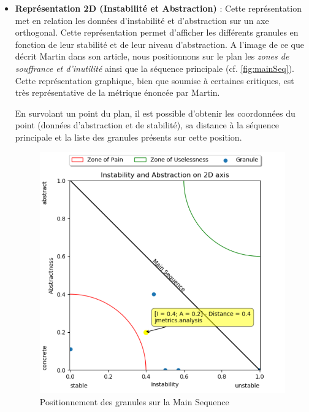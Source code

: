 \documentclass{scrartcl}
\begin{document}
\begin{itemize}
        \vspace{25mm}
        \item \textbf{Représentation 2D (Instabilité et Abstraction)} : Cette représentation met en relation les données d'instabilité et d'abstraction sur un axe orthogonal. Cette représentation permet d'afficher les différents granules en fonction de leur stabilité et de leur niveau d'abstraction. A l'image de ce que décrit Martin dans son article, nous positionnons sur le plan les \emph{zones de souffrance et d'inutilité} ainsi que la séquence principale (cf. \ref{fig:mainSeq}). Cette représentation graphique, bien que soumise à certaines critiques, est très représentative de la métrique énoncée par Martin.
        
        En survolant un point du plan, il est possible d'obtenir les coordonnées du point (données d'abstraction et de stabilité), sa distance à la séquence principale et la liste des granules présents sur cette position.
        \begin{figure}[h!]
            \centering
            \includegraphics[scale=0.59]{img/plot/2Daxis_insta_abs.png}
            \caption{Positionnement des granules sur la Main Sequence}
        \end{figure}
        

\end{itemize}
\end{document}
